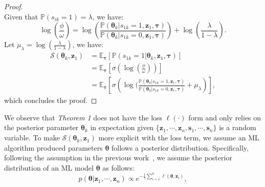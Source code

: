 \documentclass[10pt,journal,compsoc]{IEEEtran}
\begin{document}
\begin{proof}
\begin{equation}
\end{equation}
Given that $\mathbb{P}({s}_{ik}=1)=\lambda$, we have:
\begin{equation}
    \log \left( {\frac{\phi }{\omega }} \right) = \log \left( {\frac{{\mathbb{P}({\bm{\theta} _k}|{s_{1k}} = 1,{\bm{z}_1},\bm{\tau} )}}{{\mathbb{P}({\bm{\theta} _k}|{s_{1k}} = 0,{\bm{z}_1},
    \bm{\tau} )}}} \right) + \log \left( {\frac{\lambda }{{1 - \lambda }}} \right).
\end{equation}
Let $\mu_{\lambda}=\log (\frac{\lambda }{{1 - \lambda }})$, we have:
\begin{equation}
\begin{aligned}
    \mathcal{S}({\bm{\theta}_k},{\bm{z}_1}) &= {\mathbb{E}_{\bm{\tau}} }[\mathbb{P}({s_{1k}} = 1|{\bm{\theta} _k},{\bm{z}_1},\bm{\tau} )] \\
    &= {\mathbb{E}_{\bm{\tau}} }  \left[ { \sigma \left( {\log \left(\frac{\phi }{\omega }\right)} \right) } \right]\\
    &= {\mathbb{E}_{\bm{\tau}} }\left[ {{\sigma} \left( {\log (\frac{{\mathbb{P}({\bm{\theta} _k}|{{s}_{1k}} = 1,{\bm{z}_1},\bm{\tau} )}}{{\mathbb{P}({\bm{\theta} _k}|{{s}_{1k}} = 0,{\bm{z}_1},\bm{\tau} )}} + {\mu _\lambda }} \right)} \right],
\end{aligned}
\end{equation}
which concludes the proof.
\end{proof}
We observe that \textit{Theorem 1} does not have the loss $\ell(\cdot)$ form and only relies on the posterior parameter $\bm{\theta}_k$ in expectation given $\{\bm{z}_1,\cdots,\bm{z}_n,\bm{s}_1,\cdots,\bm{s}_n \}$ is a random variable. To make $\mathcal{S}({\bm{\theta}_k},{\bm{z}_1})$ more explicit with the loss term, we assume an ML algorithm produced parameters $\bm{\theta}$ follows a posterior distribution. Specifically, following the assumption in the previous work~\cite{sablayrolles2019white}, we assume the posterior distribution of an ML model $\bm{\theta}$ as follows:
\begin{equation}
    p(\bm{\theta} |{\bm{z}_1}, \cdots ,{\bm{z}_n}) \propto {e^{ - \frac{1}{\gamma }\sum\nolimits_{i = 1}^n {\ell (\bm{\theta} ,{\bm{z}_i})} }},
\end{equation}
\end{document}
